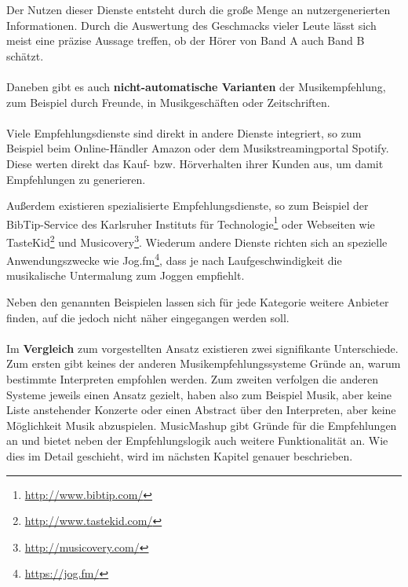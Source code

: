Der Nutzen dieser Dienste entsteht durch die große Menge an nutzergenerierten Informationen. Durch die Auswertung des Geschmacks vieler Leute lässt sich meist eine präzise Aussage treffen, ob der Hörer von Band A auch Band B schätzt.

\paragraph{} Daneben gibt es auch \textbf{nicht-automatische Varianten} der Musikempfehlung, zum Beispiel durch Freunde, in Musikgeschäften oder Zeitschriften.

\paragraph{} Viele Empfehlungsdienste sind direkt in andere Dienste integriert, so zum Beispiel beim Online-Händler Amazon oder dem Musikstreamingportal Spotify. Diese werten direkt das Kauf- bzw. Hörverhalten ihrer Kunden aus, um damit Empfehlungen zu generieren.  

Außerdem existieren spezialisierte Empfehlungsdienste, so zum Beispiel der BibTip-Service des Karlsruher Instituts für Technologie\footnote{\url{http://www.bibtip.com/}} oder Webseiten wie TasteKid\footnote{\url{http://www.tastekid.com/}} und Musicovery\footnote{\url{http://musicovery.com/}}. Wiederum andere Dienste richten sich an spezielle Anwendungszwecke wie Jog.fm\footnote{\url{https://jog.fm/}}, dass je nach Laufgeschwindigkeit die musikalische Untermalung zum Joggen empfiehlt.

Neben den genannten Beispielen lassen sich für jede Kategorie weitere Anbieter finden, auf die jedoch nicht näher eingegangen werden soll.

\paragraph{} Im \textbf{Vergleich} zum vorgestellten Ansatz existieren zwei signifikante Unterschiede. Zum ersten gibt keines der anderen Musikempfehlungssysteme Gründe an, warum bestimmte Interpreten empfohlen werden. Zum zweiten verfolgen die anderen Systeme jeweils einen Ansatz gezielt, haben also zum Beispiel Musik, aber keine Liste anstehender Konzerte oder einen Abstract über den Interpreten, aber keine Möglichkeit Musik abzuspielen. MusicMashup gibt Gründe für die Empfehlungen an und bietet neben der Empfehlungslogik auch weitere Funktionalität an. Wie dies im Detail geschieht, wird im nächsten Kapitel genauer beschrieben.